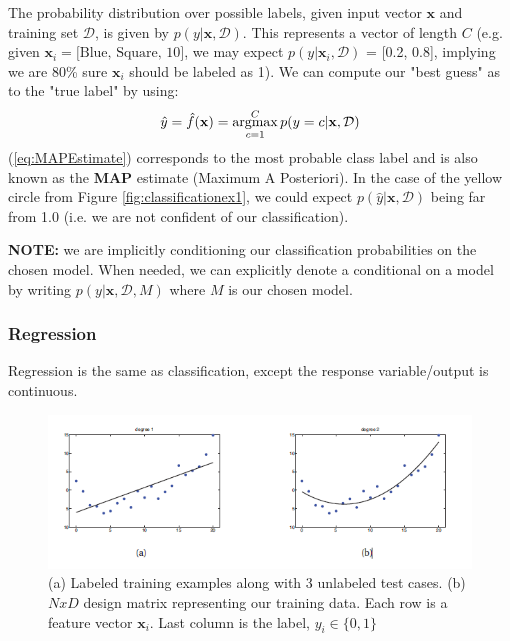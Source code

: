 \documentclass[12pt]{article}
\newcommand{\argmax}{\operatornamewithlimits{argmax}}
\begin{document}
The probability distribution over possible labels, given input vector \(\mathbf{x}\) and training set \(\mathcal{D}\), is given by \(p(y|\textbf{x},\mathcal{D}) \). This represents a vector of length \(C\) (e.g. given \(\mathbf{x}_i = \text{[Blue, Square, 10]}\), we may expect \(p(y|\mathbf{x}_i,\mathcal{D}) \) = [0.2, 0.8], implying we are 80\% sure \(\mathbf{x}_i\) should be labeled as 1). We can compute our "best guess" as to the "true label" by using:
\begin{equation}
\hat{y} = \hat{f}(\mathbf{x}) = \argmax_{c=1}^C p(y = c|\mathbf{x},\mathcal{D})
\label{eq:MAPEstimate}
\end{equation}
(\ref{eq:MAPEstimate}) corresponds to the most probable class label and is also known as the \textbf{MAP} estimate (Maximum A Posteriori). In the case of the yellow circle from Figure \ref{fig:classificationex1}, we could expect \(p(\hat{y}|\mathbf{x},\mathcal{D})\) being far from 1.0 (i.e. we are not confident of our classification).

\textbf{NOTE:} we are implicitly conditioning our classification probabilities on the chosen model. When needed, we can explicitly denote a conditional on a model by writing \(p(y|\textbf{x},\mathcal{D}, M)\) where \(M\) is our chosen model. 

\subsubsection{Regression}
Regression is the same as classification, except the response variable/output is continuous.

\begin{figure}[h]
\includegraphics[width=\textwidth]{murphy-fig-1-7.png}
\caption{(a) Labeled training examples along with 3 unlabeled test cases. (b) \(N x D\) design matrix representing our training data. Each row is a feature vector \(\mathbf{x}_i\). Last column is the label, \(y_i \in \lbrace 0, 1 \rbrace \) \cite{murphy}}
\label{fig:regressionex1}
\end{figure}
\end{document}
